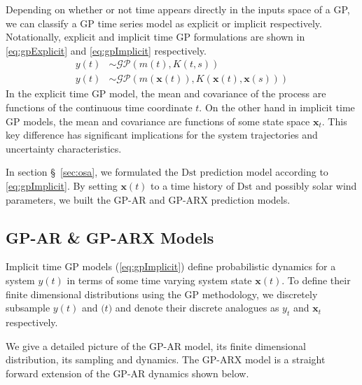 Depending on whether or not time appears directly in the inputs space of a GP, we can classify a GP time series 
model as explicit or implicit respectively. Notationally, explicit and implicit time GP formulations are shown 
in \cref{eq:gpExplicit} and \cref{eq:gpImplicit} respectively.
%
\begin{align}
    y(t) &\sim \mathcal{GP}(m(t), K(t, s)) \label{eq:gpExplicit}\\
    y(t) &\sim \mathcal{GP}(m(\mathbf{x}(t)), K(\mathbf{x}(t), \mathbf{x}(s))) \label{eq:gpImplicit}
\end{align}
%
In the explicit time GP model, the mean and covariance of the process are functions of the continuous time 
coordinate $t$. On the other hand in implicit time GP models, the mean and covariance are functions of some 
state space $\mathbf{x}_t$. This key difference has significant implications for the system trajectories and 
uncertainty characteristics.

In section \S~\ref{sec:osa}, we formulated the $\mathrm{Dst}$ prediction model according to \cref{eq:gpImplicit}. 
By setting $\mathbf{x}(t)$ to a time history of $\mathrm{Dst}$ and possibly solar wind parameters, we built the 
GP-AR and GP-ARX prediction models.


\subsection*{GP-AR \& GP-ARX Models}

Implicit time GP models (\cref{eq:gpImplicit}) define probabilistic dynamics for a system $y(t)$ in terms
of some time varying system state $\mathbf{x}(t)$. To define their finite dimensional distributions using the 
GP methodology, we discretely subsample $y(t)$ and $\mathbf(t)$ and denote their discrete analogues as $y_t$ and 
$\mathbf{x}_t$ respectively.  

We give a detailed picture of the GP-AR model, its finite dimensional distribution, its sampling and dynamics. 
The GP-ARX model is a straight forward extension of the GP-AR dynamics shown below.

